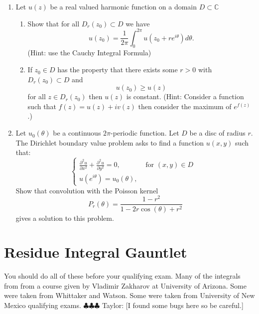 \documentclass[a4paper,10pt]{article}
\newcommand{\CC}{\mathbb{C}}
\newcommand{\taylor}[1]{{\color{blue} \sf $\clubsuit\clubsuit\clubsuit$ Taylor: [#1]}}
\begin{document}
\begin{enumerate}
	\item Let $u(z)$ be a real valued harmonic function on a domain $D \subset \CC$ 

	\begin{enumerate}
		\item Show that for all $D_r(z_0) \subset D$ we have 
		$$ u(z_0) = \frac{1}{2\pi} \int_0^{2\pi} u(z_0+ r e^{i\theta}) d\theta. $$ (Hint: use the Cauchy Integral Formula)
		\item If $z_0 \in D$ has the property that there exists some $r>0$ with $D_r(z_0) \subset D$ and 
		$$ u(z_0) \geq u(z) $$
		for all $z \in D_r(z_0)$ then $u(z)$ is constant. 
		(Hint: Consider a function such that $f(z) = u(z)+iv(z)$ then consider the maximum of $e^{f(z)}$.)
	\end{enumerate}
		
			
		\item Let $u_0(\theta)$ be a continuous $2\pi$-periodic function. 
			Let $D$ be a disc of radius $r$. 
			The Dirichlet boundary value problem asks to find a function $u(x,y)$ such that:
			$$ \begin{cases}
			\frac{\partial^2 u}{\partial x^2} + \frac{\partial^2 u}{\partial y^2} =0, & \mbox{ for $(x,y)\in D$ } \\
			u(e^{i\theta})= u_0(\theta), & 
			\end{cases}
			$$
			Show that convolution with the Poisson kernel 
			$$P_r(\theta) = \frac{1-r^2}{1-2r\cos(\theta) + r^2}$$
			gives a solution to this problem. 
			
	
	

	
\end{enumerate}

\section{Residue Integral Gauntlet}
You should do all of these before your qualifying exam. 
Many of the integrals from from a course given by Vladimir Zakharov at University of Arizona. 
Some were taken from Whittaker and Watson. Some were taken from University of New Mexico qualifying exams.\taylor{I found some bugs here so be careful.}
\end{document}
